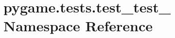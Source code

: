 \hypertarget{namespacepygame_1_1tests_1_1test__test__}{}\section{pygame.\+tests.\+test\+\_\+test\+\_\+ Namespace Reference}
\label{namespacepygame_1_1tests_1_1test__test__}
